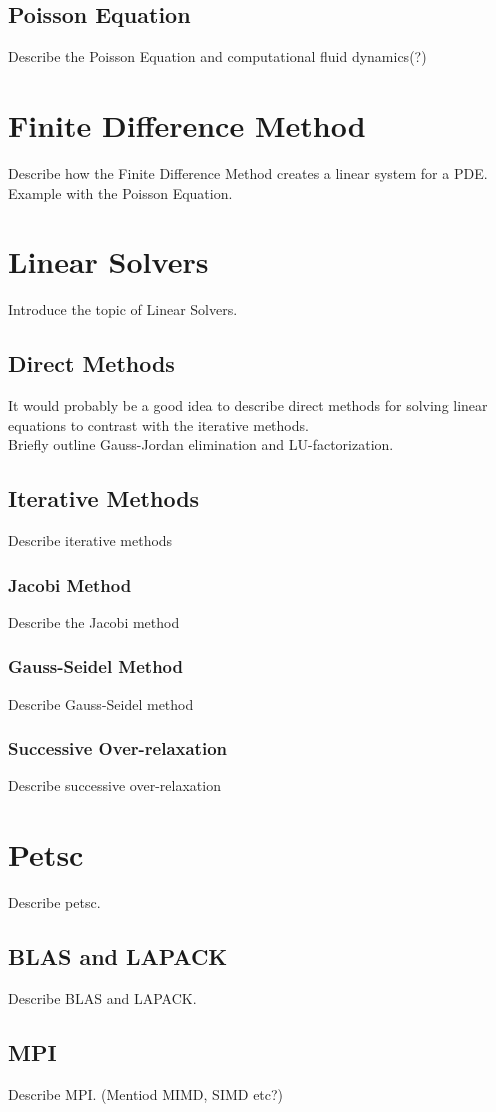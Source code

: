 \subsection*{Poisson Equation}

Describe the Poisson Equation and computational fluid dynamics(?)

\section*{Finite Difference Method}

Describe how the Finite Difference Method creates a linear system for a PDE. \\
Example with the Poisson Equation.

\section*{Linear Solvers}

Introduce the topic of Linear Solvers.

\subsection*{Direct Methods}

It would probably be a good idea to describe direct methods for solving linear equations to contrast with the iterative methods. \\
Briefly outline Gauss-Jordan elimination and LU-factorization. 

\subsection*{Iterative Methods}

Describe iterative methods

\subsubsection*{Jacobi Method}

Describe the Jacobi method

\subsubsection*{Gauss-Seidel Method}

Describe Gauss-Seidel method

\subsubsection*{Successive Over-relaxation}

Describe successive over-relaxation

\section*{Petsc}

Describe petsc.

\subsection*{BLAS and LAPACK}

Describe BLAS and LAPACK.

\subsection*{MPI}

Describe MPI. (Mentiod MIMD, SIMD etc?)



